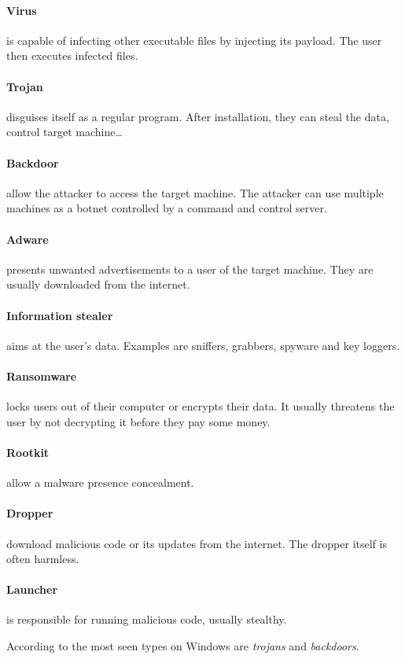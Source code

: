 \paragraph{Virus} is capable of infecting other executable files by injecting its payload. The user then executes infected files.
\paragraph{Trojan} disguises itself as a regular program. After installation, they can steal the data, control target machine\dots
\paragraph{Backdoor} allow the attacker to access the target machine. The attacker can use multiple machines as a botnet controlled by a command and control server.
\paragraph{Adware} presents unwanted advertisements to a user of the target machine. They are usually downloaded from the internet.
\paragraph{Information stealer} aims at the user's data. Examples are sniffers, grabbers, spyware and key loggers.
\paragraph{Ransomware} locks users out of their computer or encrypts their data. It usually threatens the user by not decrypting it before they pay some money.
\paragraph{Rootkit} allow a malware presence concealment.
\paragraph{Dropper} download malicious code or its updates from the internet. The dropper itself is often harmless.
\paragraph{Launcher} is responsible for running malicious code, usually stealthy.

According to \cite{AVATLASM39:online} the most seen types on Windows are \emph{trojans} and \emph{backdoors}.

